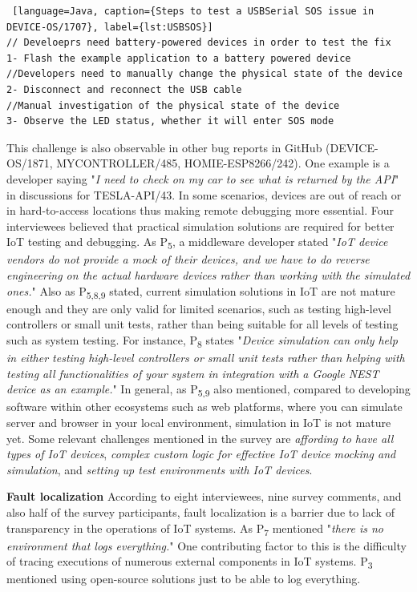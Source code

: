 { \begin{lstlisting} [language=Java, caption={Steps to test a USBSerial SOS issue in DEVICE-OS/1707}, label={lst:USBSOS}] 
// Develoeprs need battery-powered devices in order to test the fix
1- Flash the example application to a battery powered device
//Developers need to manually change the physical state of the device
2- Disconnect and reconnect the USB cable
//Manual investigation of the physical state of the device
3- Observe the LED status, whether it will enter SOS mode
\end{lstlisting}

This challenge is also observable in other bug reports in GitHub (DEVICE-OS/1871, MYCONTROLLER/485, HOMIE-ESP8266/242). 
One example is a developer saying "\emph{I need to check on my car to see what is returned by the API}" in discussions for TESLA-API/43.
In some scenarios, devices are out of reach or in hard-to-access locations thus making remote debugging more essential. 
Four interviewees believed that practical simulation solutions are required for better IoT testing and debugging. As P\textsubscript{5}, a middleware developer stated "\emph{IoT device vendors do not provide a mock of their devices, and we have to do reverse engineering on the actual hardware devices rather than working with the simulated ones.}" Also as P\textsubscript{5,8,9} stated, current simulation solutions in IoT are not mature enough and they are only valid for limited scenarios, such as testing high-level controllers or small unit tests, rather than being suitable for all levels of testing such as system testing.
 For instance, P\textsubscript{8} states "\emph{Device simulation can only help in either testing high-level controllers or small unit tests rather than helping with testing all functionalities of your system in integration with a Google NEST device as an example.}"
 In general, as P\textsubscript{5,9} also mentioned, compared to developing software within other ecosystems such as web platforms, where you can simulate server and browser in your local environment, simulation in IoT is not mature yet.
Some relevant challenges mentioned in the survey are \emph{affording to have all types of IoT devices}, \emph{complex custom logic for effective IoT device mocking and simulation}, and \emph{setting up test environments with IoT devices}. 

\textbf{Fault localization}
According to eight interviewees, nine survey comments, and also half of the survey participants, fault localization is a barrier due to lack of transparency in the operations of IoT systems. As P\textsubscript{7} mentioned "\emph{there is no environment that logs everything.}" One contributing factor to this is the difficulty of tracing executions of numerous external components in IoT systems. P\textsubscript{3} mentioned using open-source solutions just to be able to log everything. 

}
